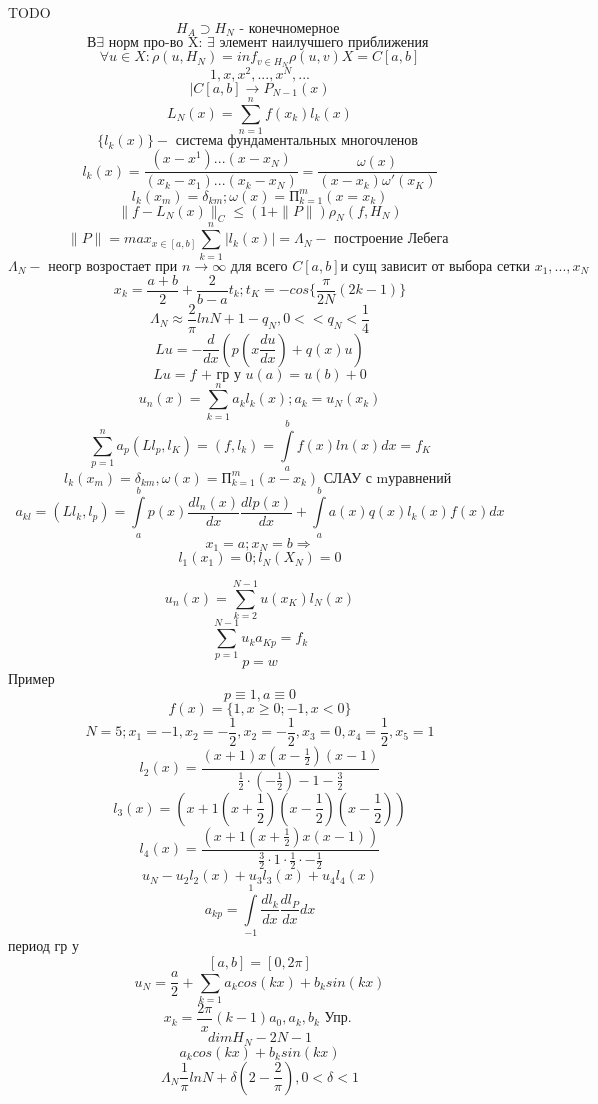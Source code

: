 \documentclass[12pt, a4paper]{article}
\newcommand{\Int}{\int\limits}
\newcommand{\Sum}{\sum\limits}
\begin{document}
TODO
\[ H_A \supset H_N  \textrm{ - конечномерное }\]
\[ В \exists \textrm{ норм про-во X:  } \exists \textrm{ элемент наилучшего приближения }  \]
\[ \forall u \in X: \rho(u, H_N) = {inf}_{v \in H_N} \rho(u, v) X = C[a, b] \]
\[ 1, x, x^2, ..., x^N, ... \]
\[ | C[a, b] \rightarrow P_{N-1} (x) \]
\[ L_N(x) = \Sum_{n=1}^{n} f(x_k) l_k(x) \]
\[ \{ l_k(x) \} -\textrm{ система фундаментальных многочленов } \]
\[ l_k(x) = \frac{(x-x^1) ... (x-x_N)}{(x_k-x_1) ... (x_k - x_N)} = \frac{\omega(x)}{(x-x_k) \omega'(x_K)} \]
\[ l_k(x_m) = \delta _{km}; \omega (x) = П_{k=1}^{m} (x = x_k) \]
\[ \| f - L_N(x) \|_C \leq (1+\|P\|)\rho_N (f, H_N) \]
\[ \|P\| = {max}_{x \in [a, b]} \Sum_{k=1}^{n} |l_k(x)| = \Lambda_N - \textrm{ построение Лебега }\]
\[ \Lambda_N - \textrm{ неогр возростает при  } n\rightarrow \infty \textrm{ для всего  } C[a,b] \textrm{и сущ зависит от выбора сетки } x_1, ... , x_N\]
\[ x_k = \frac{a+b}{2} + \frac{2}{b-a} t_k; t_K = -cos\{\frac{\pi}{2N}(2k-1)\}  \]
\[ \Lambda_N \approx \frac{2}{\pi} ln N + 1- q_N, 0<< q_N < \frac{1}{4} \]
\[ Lu = -\frac{d}{dx}(p(x \frac{du}{dx}) + q(x) u) \]
\[ Lu = f\textrm{ + гр у } u(a) = u(b) + 0 \]
\[ u_n(x) = \Sum_{k=1}^{n} a_k l_k(x); a_k = u_N(x_k) \]
\[ \Sum_{p=1}^{n} a_p (Ll_p, l_K) = (f, l_k) = \Int_{a}^{b} f(x) ln(x) dx = f_K \]
\[ l_k(x_m) = \delta_{km}, \omega(x) = П^{m}_{k=1} (x- x_k) \textrm{ СЛАУ с mуравнений }\]
\[ a_{kl} = (Ll_k, l_p) = \Int_{a}^{b}p(x) \frac{dl_n(x)}{dx} \frac{dlp(x)}{dx} + \Int_{a}^{b}a(x) q(x) l_k(x) f(x) dx \]
\[ x_1 = a; x_N = b \Rightarrow \]
\[ l_1(x_1) = 0; l_N (X_N) = 0 \]

\[ u_n(x) = \Sum_{k=2}^{N-1}u(x_K) l_N(x) \]
\[ \Sum_{p=1}^{N-1}u_k a_{Kp} = f_{k} \]
\[ p = w \]
Пример
\[ p \equiv 1, a \equiv 0 \]
\[ f(x) = \{1, x \geq 0; -1, x<0 \} \]
\[ N=5; x_1=-1, x_2 = -\frac{1}{2}, x_2=-\frac{1}{2}, x_3 = 0, x_4 = \frac{1}{2}, x_5=1 \]
\[ l_2(x) = \frac{(x+1)x(x-\frac{1}{2})(x-1)}{\frac{1}{2}\cdot(-\frac{1}{2}) -1 -\frac{3}{2}} \]
\[ l_3(x) = (x+1(x+\frac{1}{2})(x-\frac{1}{2})(x-\frac{1}{2})) \]
\[ l_4(x)  = \frac{(x+1(x+\frac{1}{2})x(x-1))}{\frac{3}{2} \cdot 1 \cdot \frac{1}{2} \cdot -\frac{1}{2}} \]
\[ u_N - u_2 l_2(x) + u_3l_3(x) + u_4l_4(x) \]
\[ a_{kp} = \Int_{-1}^{1} \frac{dl_k}{dx} \frac{dl_P}{dx} dx \]
период гр у
\[ [a, b] = [0, 2 \pi] \]
\[ u_N = \frac{a}{2} + \Sum_{k=1}^{} a_k cos(kx) + b_k sin(kx) \]
\[ x_k = \frac{2 \pi}{x}(k-1) a_0, a_k, b_k \textrm{ Упр. } \]
\[ dim H_N - 2N-1 \]
\[ a_k cos(kx)+ b_k sin(kx) \]
\[ \Lambda_N \frac{1}{\pi} ln N + \delta (2-\frac{2}{\pi}), 0 < \delta < 1 \]
\end{document}
